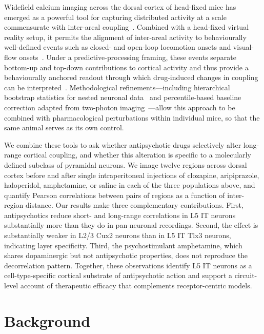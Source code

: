 \documentclass[11pt]{article}
\begin{document}
Widefield calcium imaging across the dorsal cortex of head-fixed mice has emerged as a powerful tool for capturing distributed activity at a scale commensurate with inter-areal coupling~\citep{musall2019single, leinweber2017sensorimotor}. Combined with a head-fixed virtual reality setup, it permits the alignment of inter-areal activity to behaviourally well-defined events such as closed- and open-loop locomotion onsets and visual-flow onsets~\citep{leinweber2017sensorimotor, keller2012sensorimotor, attinger2017visuomotor, keller2018predictive}. Under a predictive-processing framing, these events separate bottom-up and top-down contributions to cortical activity and thus provide a behaviourally anchored readout through which drug-induced changes in coupling can be interpreted~\citep{keller2018predictive, zmarz2016mismatch}. Methodological refinements---including hierarchical bootstrap statistics for nested neuronal data~\citep{saravanan2020hierarchical} and percentile-based baseline correction adapted from two-photon imaging~\citep{dombeck2007imaging}---allow this approach to be combined with pharmacological perturbations within individual mice, so that the same animal serves as its own control.

We combine these tools to ask whether antipsychotic drugs selectively alter long-range cortical coupling, and whether this alteration is specific to a molecularly defined subclass of pyramidal neurons. We image twelve regions across dorsal cortex before and after single intraperitoneal injections of clozapine, aripiprazole, haloperidol, amphetamine, or saline in each of the three populations above, and quantify Pearson correlations between pairs of regions as a function of inter-region distance. Our results make three complementary contributions. First, antipsychotics reduce short- and long-range correlations in L5 IT neurons substantially more than they do in pan-neuronal recordings. Second, the effect is substantially weaker in L2/3 Cux2 neurons than in L5 IT Tlx3 neurons, indicating layer specificity. Third, the psychostimulant amphetamine, which shares dopaminergic but not antipsychotic properties, does not reproduce the decorrelation pattern. Together, these observations identify L5 IT neurons as a cell-type-specific cortical substrate of antipsychotic action and support a circuit-level account of therapeutic efficacy that complements receptor-centric models.

\section{Background}
\end{document}
